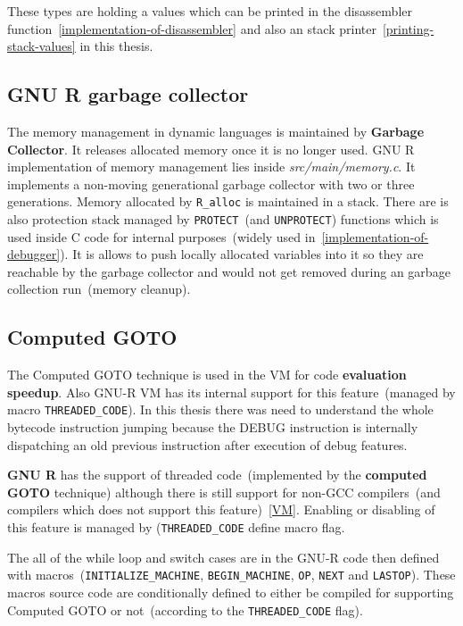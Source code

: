 \documentclass[thesis=M,english]{FITthesis}[2018/10/20]
\newcommand{\code}[1]{\texttt{#1}}
\begin{document}
These types are holding a values which can be printed in the disassembler function~\ref{implementation-of-disassembler} and also an stack printer~\ref{printing-stack-values} in this thesis.

\subsection{GNU R garbage collector}\label{GC}

The memory management in dynamic languages is maintained by  \textbf{Garbage Collector}. It releases allocated memory once it is no longer used. GNU R implementation of memory management lies inside \textit{src/main/memory.c}. It implements a non-moving generational garbage collector with two or three generations. Memory allocated by \code{R{\_}alloc} is maintained in a stack. There are is also protection stack managed by \code{PROTECT}~(and \code{UNPROTECT}) functions which is used inside C code for internal purposes~(widely used in~\ref{implementation-of-debugger}). It is allows to push locally allocated variables into it so they are reachable by the garbage collector and would not get removed during an garbage collection run~(memory cleanup).

\subsection{Computed GOTO}\label{Computed-GOTO}

The Computed GOTO technique is used in the VM for code \textbf{evaluation speedup}. Also GNU-R VM has its internal support for this feature~(managed by macro \code{THREADED{\_}CODE}). In this thesis there was need to understand the whole bytecode instruction jumping because the DEBUG instruction is internally dispatching an old previous instruction after execution of debug features.

\textbf{GNU R} has the support of threaded code~(implemented by the \textbf{computed GOTO} technique) although there is still support for non-GCC compilers~(and compilers which does not support this feature)~\ref{VM}. Enabling or disabling of this feature is managed by (\code{THREADED{\_}CODE} define macro flag. 

The all of the while loop and switch cases are in the GNU-R code then defined with macros~(\code{INITIALIZE{\_}MACHINE}, \code{BEGIN{\_}MACHINE}, \code{OP}, \code{NEXT} and \code{LASTOP}). These macros source code are conditionally defined to either be compiled for supporting Computed GOTO or not~(according to the \code{THREADED{\_}CODE} flag).
\end{document}
